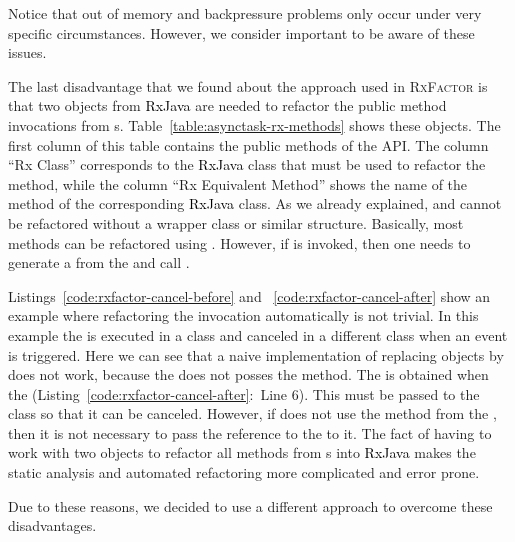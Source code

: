 \documentclass[type=bsc,accentcolor=tud9c]{tudthesis}
\newcommand{\framework}[1]{\textcolor{black}{#1}}
\begin{document}
Notice that out of memory and backpressure problems only occur under very specific circumstances. However, we consider important to be aware of these issues.

The last disadvantage that we found about the approach used in \textsc{RxFactor} is that two objects from \framework{RxJava} are needed to refactor the public method invocations from s. Table~\ref{table:asynctask-rx-methods} shows these objects. The first column of this table contains the public methods of the  API. The column ``Rx Class'' corresponds to the \framework{RxJava} class that must be used to refactor the  method, while the column ``Rx Equivalent Method'' shows the name of the method of the corresponding \framework{RxJava} class. As we already explained,  and  cannot be refactored without a wrapper class or similar structure. Basically, most methods can be refactored using . However, if  is invoked, then one needs to generate a  from the  and call .



Listings~\ref{code:rxfactor-cancel-before} and ~\ref{code:rxfactor-cancel-after} show an example where refactoring the  invocation automatically is not trivial. In this example the  is executed in a class and canceled in a different class when an event is triggered. Here we can see that a naive implementation of replacing  objects by  does not work, because the  does not posses the  method. The  is obtained when the  (Listing~\ref{code:rxfactor-cancel-after}:~Line 6). This  must be passed to the class  so that it can be canceled. However, if  does not use the  method from the , then it is not necessary to pass the reference to the  to it. The fact of having to work with two objects to refactor all methods from s into \framework{RxJava} makes the static analysis and automated refactoring more complicated and error prone.



Due to these reasons, we decided to use a different approach to overcome these disadvantages.
\end{document}
